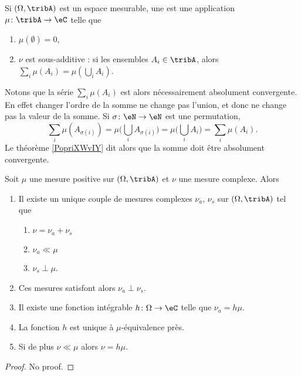 \begin{definition} \label{DefGKHLooYjocEt}
    Si \( (\Omega,\tribA)\) est un espace mesurable, une  est une application \( \mu\colon \tribA\to \eC\) telle que
    \begin{enumerate}
        \item
            $\mu(\emptyset)=0$,
        \item
            \( \nu\) est sous-additive : si les ensembles \( A_i\in\tribA\), alors \( \sum_i\mu(A_i)=\mu(\bigcup_iA_i)\).
    \end{enumerate}
\end{definition}
Notons que la série $\sum_i\mu(A_i)$ est alors nécessairement absolument convergente. En effet changer l'ordre de la somme ne change pas l'union, et donc ne change pas la valeur de la somme. Si \( \sigma\colon \eN\to \eN\) est une permutation, 
\begin{equation}
    \sum_i\mu(A_{\sigma(i)})=\mu\big( \bigcup_iA_{\sigma(i)} \big)=\mu\big( \bigcup_iA_i \big)=\sum_i\mu(A_i).
\end{equation}
Le théorème \ref{PopriXWvIY} dit alors que la somme doit être absolument convergente.


\begin{theorem}\label{ThoZZMGooKhRYaO}
    Soit \( \mu\) une mesure positive sur \( (\Omega,\tribA)\) et \( \nu\) une mesure complexe. Alors
    \begin{enumerate}
        \item
            Il existe un unique couple de mesures complexes \( \nu_a\), \( \nu_s\) sur \( (\Omega,\tribA)\) tel que
            \begin{enumerate}
                \item
                    \( \nu=\nu_a+\nu_s\)
                \item
                    \( \nu_a\ll\mu\)
                \item
                    \( \nu_s\perp \mu\).
            \end{enumerate}
        \item
            Ces mesures satisfont alors \( \nu_a\perp\nu_s\).
        \item
            Il existe une fonction intégrable \( h\colon \Omega\to \eC\) telle que \( \nu_a=h\mu\).
        \item
            La fonction \( h\) est unique à \( \mu\)-équivalence près.
        \item   \label{ItemDIXOooFqOkgGv}
            Si de plus \( \nu\ll \mu\) alors \( \nu=h\mu\).
    \end{enumerate}
\end{theorem}
\begin{proof}
    No proof.
\end{proof}

